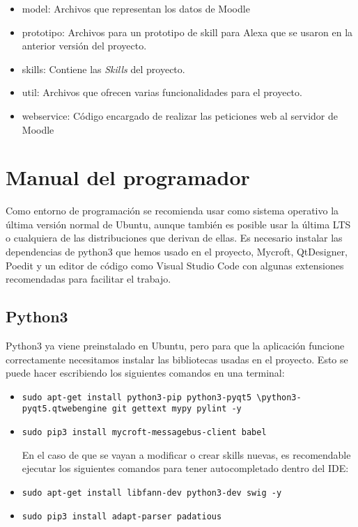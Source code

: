 \begin{itemize}
\begin{itemize}
        \item model: Archivos que representan los datos de Moodle
        \item prototipo: Archivos para un prototipo de skill para Alexa que se usaron en la anterior versión del proyecto.
        \item skills: Contiene las \textit{Skills} del proyecto.
        \item util: Archivos que ofrecen varias funcionalidades para el proyecto.
        \item webservice: Código encargado de realizar las peticiones web al servidor de Moodle
    \end{itemize}
\end{itemize}

\section{Manual del programador}
Como entorno de programación se recomienda usar como sistema operativo la última versión normal de Ubuntu, aunque también es posible usar la última LTS o cualquiera de las distribuciones que derivan de ellas. Es necesario instalar las dependencias de python3 que hemos usado en el proyecto, Mycroft, QtDesigner, Poedit y un editor de código como Visual Studio Code con algunas extensiones recomendadas para facilitar el trabajo.

\subsection{Python3}
Python3 ya viene preinstalado en Ubuntu, pero para que la aplicación funcione correctamente necesitamos instalar las bibliotecas usadas en el proyecto. Esto se puede hacer escribiendo los siguientes comandos en una terminal:
\begin{itemize}
    \item \texttt{sudo apt-get install python3-pip python3-pyqt5 \textbackslash\newline python3-pyqt5.qtwebengine git gettext mypy pylint -y}
    \item \texttt{sudo pip3 install mycroft-messagebus-client babel}
    
    En el caso de que se vayan a modificar o crear skills nuevas, es recomendable ejecutar los siguientes comandos para tener autocompletado dentro del IDE:
    \item \texttt{sudo apt-get install libfann-dev python3-dev swig -y}
    \item \texttt{sudo pip3 install adapt-parser padatious}
\end{itemize}

